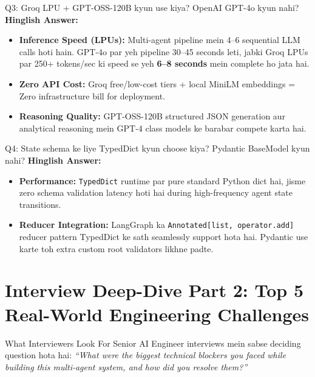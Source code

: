 \documentclass[9.5pt, a4paper]{article}
\begin{document}
\begin{interviewbox}{Q3: Groq LPU + GPT-OSS-120B kyun use kiya? OpenAI GPT-4o kyun nahi?}
\textbf{Hinglish Answer:}
\begin{itemize}
    \item \textbf{Inference Speed (LPUs):} Multi-agent pipeline mein 4--6 sequential LLM calls hoti hain. GPT-4o par yeh pipeline 30--45 seconds leti, jabki Groq LPUs par 250+ tokens/sec ki speed se yeh \textbf{6--8 seconds} mein complete ho jata hai.
    \item \textbf{Zero API Cost:} Groq free/low-cost tiers + local MiniLM embeddings = Zero infrastructure bill for deployment.
    \item \textbf{Reasoning Quality:} GPT-OSS-120B structured JSON generation aur analytical reasoning mein GPT-4 class models ke barabar compete karta hai.
\end{itemize}
\end{interviewbox}

\begin{interviewbox}{Q4: State schema ke liye TypedDict kyun choose kiya? Pydantic BaseModel kyun nahi?}
\textbf{Hinglish Answer:}
\begin{itemize}
    \item \textbf{Performance:} \texttt{TypedDict} runtime par pure standard Python dict hai, jisme zero schema validation latency hoti hai during high-frequency agent state transitions.
    \item \textbf{Reducer Integration:} LangGraph ka \texttt{Annotated[list, operator.add]} reducer pattern TypedDict ke sath seamlessly support hota hai. Pydantic use karte toh extra custom root validators likhne padte.
\end{itemize}
\end{interviewbox}

\clearpage
\section{Interview Deep-Dive Part 2: Top 5 Real-World Engineering Challenges}

\begin{conceptbox}{What Interviewers Look For}
Senior AI Engineer interviews mein sabse deciding question hota hai: \textit{``What were the biggest technical blockers you faced while building this multi-agent system, and how did you resolve them?''}
\end{conceptbox}
\end{document}
